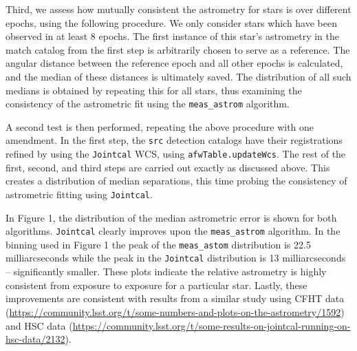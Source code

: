 \documentclass[DM,toc]{lsstdoc}
\begin{document}
Third, we assess how mutually consistent the astrometry for stars is over different epochs, using the following procedure. We only consider stars which have been observed in at least 8 epochs. The first instance of this star's astrometry in the match catalog from the first step is arbitrarily chosen to serve as a reference. The angular distance between the reference epoch and all other epochs is calculated, and the median of these distances is ultimately saved. The distribution of all such medians is obtained by repeating this for all stars, thus examining the consistency of the astrometric fit using the {\tt\string meas\_astrom} algorithm.

A second test is then performed, repeating the above procedure with one amendment. In the first step, the {\tt\string src} detection catalogs have their registrations refined by using the {\tt\string Jointcal} WCS, using {\tt\string afwTable.updateWcs}. The rest of the first, second, and third steps are carried out exactly as discussed above. This creates a distribution of median separations, this time probing the consistency of astrometric fitting using {\tt\string Jointcal}.

In Figure 1, the distribution of the median astrometric error is shown for both algorithms. {\tt\string Jointcal} clearly improves upon the {\tt\string meas\_astrom} algorithm. In the binning used in Figure 1 the peak of the {\tt\string meas\_astom} distribution is 22.5 milliarcseconds while the peak in the {\tt\string Jointcal} distribution is 13 milliarcseconds -- significantly smaller. These plots indicate the relative astrometry is highly consistent from exposure to exposure for a particular star. Lastly, these improvements are consistent with results from a similar study using CFHT data
(\url{https://community.lsst.org/t/some-numbers-and-plots-on-the-astrometry/1592}) and HSC data (\url{https://community.lsst.org/t/some-results-on-jointcal-running-on-hsc-data/2132}).
\end{document}
